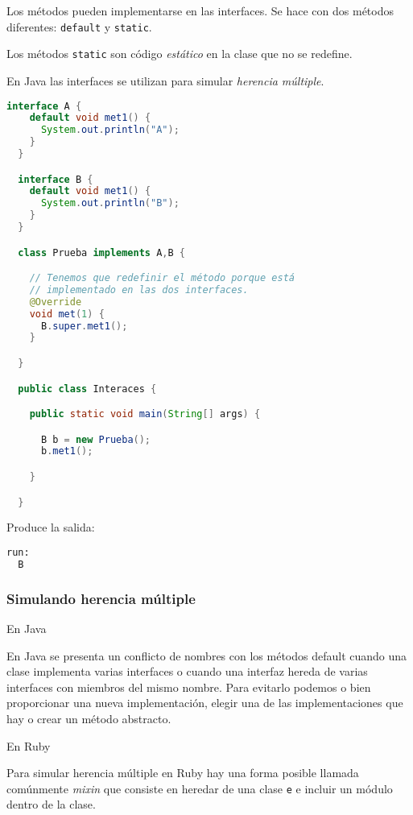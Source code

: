 \documentclass[10pt, a4paper]{article}
\newif\IfInSansMode
\begin{document}
Los métodos pueden implementarse en las interfaces. Se hace con dos
métodos diferentes: \texttt{default} y \texttt{static}.

Los métodos \texttt{static} son código \textit{estático} en la clase que
no se redefine.

En Java las interfaces se utilizan para simular
\textit{herencia múltiple}.

\begin{lstlisting}[language=Java]
  interface A {
    default void met1() {
      System.out.println("A");
    }
  }

  interface B {
    default void met1() {
      System.out.println("B");
    }
  }

  class Prueba implements A,B {

    // Tenemos que redefinir el método porque está
    // implementado en las dos interfaces.
    @Override
    void met(1) {
      B.super.met1();
    }

  }

  public class Interaces {

    public static void main(String[] args) {

      B b = new Prueba();
      b.met1();

    }

  }
\end{lstlisting}

Produce la salida:

\begin{lstlisting}[language=bash, style=terminal]
  run:
  B
\end{lstlisting}

\subsubsection{Simulando herencia múltiple}

En Java

En Java se presenta un conflicto de nombres con los métodos default
cuando una clase implementa varias interfaces o cuando una interfaz
hereda de varias interfaces con miembros del mismo nombre. Para evitarlo
podemos o bien proporcionar una nueva implementación, elegir una de las
implementaciones que hay o crear un método abstracto.

En Ruby

Para simular herencia múltiple en Ruby hay una forma posible llamada
comúnmente \textit{mixin} que consiste en heredar de una clase
\texttt{e} e incluir un módulo dentro de la clase.
\end{document}
